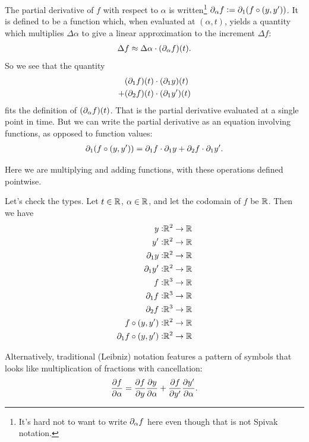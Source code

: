 The partial derivative of $f$ with respect to $\alpha$ is written\footnote{It's hard not to want to
  write $\partial_\alpha f$ here even though that is not Spivak notation.}
$\partial_\alpha f := \partial_1 (f \circ (y, y'))$. It is defined to be a function which, when evaluated at
$(\alpha, t)$, yields a quantity which multiplies $\Delta\alpha$ to give a linear approximation to the
increment $\Delta f$:
\begin{align*}
  \Delta f \approx \Delta\alpha \cdot (\partial_\alpha f)(t).
\end{align*}
So we see that the quantity
\begin{align*}
    &(\partial_1 f)(t) \cdot (\partial_1 y)(t) \\
  + &(\partial_2 f)(t) \cdot (\partial_1 y')(t)
\end{align*}
fits the definition of $(\partial_\alpha f)(t)$. That is the partial derivative evaluated at a single
point in time. But we can write the partial derivative as an equation involving functions, as
opposed to function values:
\begin{align*}
  \partial_1 (f \circ (y, y')) = \partial_1 f \cdot \partial_1 y + \partial_2 f \cdot \partial_1 y'.
\end{align*}

Here we are multiplying and adding functions, with these operations defined pointwise.

Let's check the types. Let $t \in \mathbb{R}$, $\alpha \in \mathbb{R}$, and let the codomain of $f$ be $\mathbb{R}$. Then
we have
\begin{align*}
  y:                      &\mathbb{R}^2 \to \mathbb{R} \\
  y':                     &\mathbb{R}^2 \to \mathbb{R} \\
  \partial_1 y:               &\mathbb{R}^2 \to \mathbb{R} \\
  \partial_1 y':              &\mathbb{R}^2 \to \mathbb{R} \\
  f:                      &\mathbb{R}^3 \to \mathbb{R} \\
  \partial_1 f:               &\mathbb{R}^3 \to \mathbb{R} \\
  \partial_2 f:               &\mathbb{R}^3 \to \mathbb{R} \\
  f \circ (y, y'):        &\mathbb{R}^2 \to \mathbb{R} \\
  \partial_1 f \circ (y, y'): &\mathbb{R}^2 \to \mathbb{R}
\end{align*}

Alternatively, traditional (Leibniz) notation features a pattern of symbols that looks like
multiplication of fractions with cancellation:
\begin{align*}
  \pdv{f}{\alpha} = \pdv{f}{y} \pdv{y}{\alpha} + \pdv{f}{y'}\pdv{y'}{\alpha}.
\end{align*}

